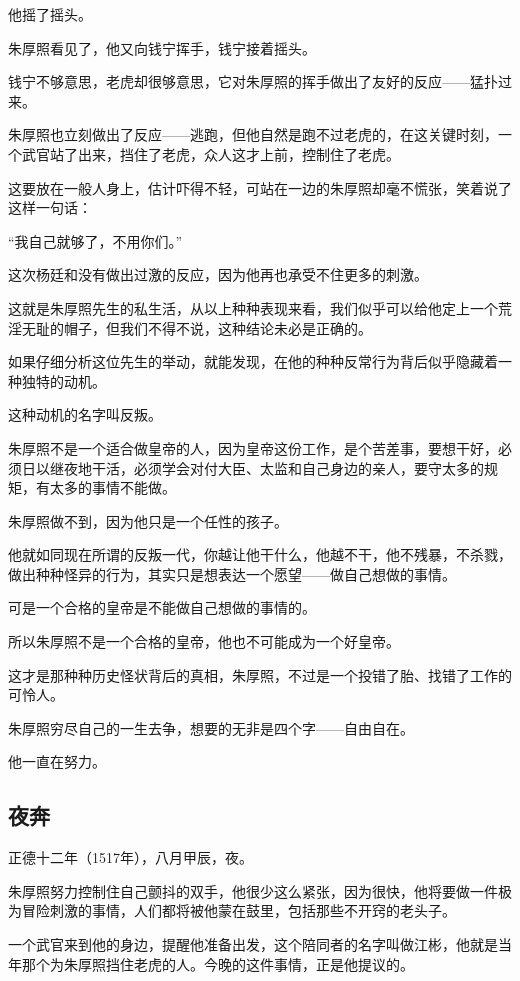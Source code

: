 \begin{multicols}{\theparacolNo}
他摇了摇头。

朱厚照看见了，他又向钱宁挥手，钱宁接着摇头。

钱宁不够意思，老虎却很够意思，它对朱厚照的挥手做出了友好的反应——猛扑过来。

朱厚照也立刻做出了反应——逃跑，但他自然是跑不过老虎的，在这关键时刻，一个武官站了出来，挡住了老虎，众人这才上前，控制住了老虎。

这要放在一般人身上，估计吓得不轻，可站在一边的朱厚照却毫不慌张，笑着说了这样一句话：

“我自己就够了，不用你们。”

这次杨廷和没有做出过激的反应，因为他再也承受不住更多的刺激。

这就是朱厚照先生的私生活，从以上种种表现来看，我们似乎可以给他定上一个荒淫无耻的帽子，但我们不得不说，这种结论未必是正确的。

如果仔细分析这位先生的举动，就能发现，在他的种种反常行为背后似乎隐藏着一种独特的动机。

这种动机的名字叫反叛。

朱厚照不是一个适合做皇帝的人，因为皇帝这份工作，是个苦差事，要想干好，必须日以继夜地干活，必须学会对付大臣、太监和自己身边的亲人，要守太多的规矩，有太多的事情不能做。

朱厚照做不到，因为他只是一个任性的孩子。

他就如同现在所谓的反叛一代，你越让他干什么，他越不干，他不残暴，不杀戮，做出种种怪异的行为，其实只是想表达一个愿望——做自己想做的事情。

可是一个合格的皇帝是不能做自己想做的事情的。

所以朱厚照不是一个合格的皇帝，他也不可能成为一个好皇帝。

这才是那种种历史怪状背后的真相，朱厚照，不过是一个投错了胎、找错了工作的可怜人。

朱厚照穷尽自己的一生去争，想要的无非是四个字——自由自在。

他一直在努力。

\subsection{夜奔}
正德十二年（1517年），八月甲辰，夜。

朱厚照努力控制住自己颤抖的双手，他很少这么紧张，因为很快，他将要做一件极为冒险刺激的事情，人们都将被他蒙在鼓里，包括那些不开窍的老头子。

一个武官来到他的身边，提醒他准备出发，这个陪同者的名字叫做江彬，他就是当年那个为朱厚照挡住老虎的人。今晚的这件事情，正是他提议的。


\end{multicols}
